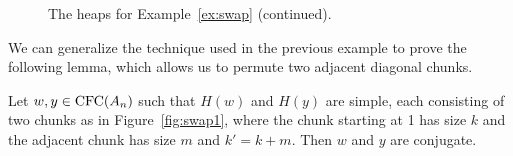 \begin{figure}[H]
\begin{subfigure}{0.3\textwidth}
\caption{}\label{fig:permexheap5}
\end{subfigure}
\begin{subfigure}{\textwidth} \centering \vspace{10pt}
\caption{}\label{fig:permexheap6}
\end{subfigure}
\caption{The heaps for Example~\ref{ex:swap} (continued).}\label{fig:permexheaps}
\end{figure}


    We can generalize the technique used in the previous example to prove the following lemma, which allows us to permute two adjacent diagonal chunks.

\begin{lemma}\label{lem:swap}
Let $w,y \in \operatorname{\mathrm{CFC}}(A_n)$ such that $H(w)$ and $H(y)$ are simple, each consisting of two chunks as in Figure~\ref{fig:swap1}, where the chunk starting at 1 has size $k$ and the adjacent chunk has size $m$ and $k'=k+m$. Then $w$ and $y$ are conjugate.
\end{lemma}

